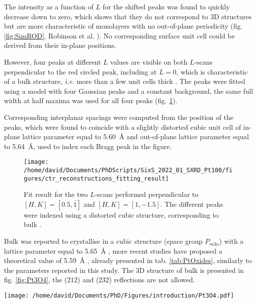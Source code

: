 The intensity as a function of $L$ for the shifted peaks was found to quickly decrease down to zero, which shows that they do not correspond to 3D structures but are more characteristic of monolayers with no out-of-plane periodicity (fig. \ref{fig:SimROD}, Robinson et al. \cite*{Robinson1991}).
No corresponding surface unit cell could be derived from their in-plane positions.

However, four peaks at different $L$ values are visible on both $L$-scans perpendicular to the red circled peak, including at $L=0$, which is characteristic of a bulk structure, \textit{i.e.} more than a few unit cells thick \parencite{Robinson1991}.
The peaks were fitted using a model with four Gaussian peaks and a constant background, the same full width at half maxima was used for all four peaks (fig. \ref{fig:FitPt100LScans}).

Corresponding interplanar spacings were computed from the position of the peaks, which were found to coincide with a slightly distorted cubic unit cell of in-plane lattice parameter equal to \qty{5.60}{\angstrom} and out-of-plane lattice parameter equal to \qty{5.64}{\angstrom}, used to index each Bragg peak in the figure.

\begin{figure}[!htb]
    \centering
    \texttt{[image: /home/david/Documents/PhDScripts/SixS\_2022\_01\_SXRD\_Pt100/figures/ctr\_reconstructions\_fitting\_result]}
    \caption{
        Fit result for the two $L$-scans performed perpendicular to $[H, K] = [0.5, \bar{1}]$ and $[H, K] = [1, -1.5]$.
        The different peaks were indexed using a distorted cubic structure, corresponding to bulk .
    }
    \label{fig:FitPt100LScans}
\end{figure}

Bulk  was reported to crystallise in a cubic structure (space group $P_{m3n}$) with a lattice parameter equal to \qty{5.65}{\angstrom} \parencite{Galloni1941, Galloni1952, Muller1968}, more recent studies have proposed a theoretical value of \qty{5.59}{\angstrom} \parencite{Seriani2006}, already presented in tab. \ref{tab:PtOxides}, similarly to the parameters reported in this study.
The 3D structure of bulk  is presented in fig. \ref{fig:Pt3O4}, the (212) and (232) reflections are not allowed.

\begin{SCfigure}
    \centering
    \texttt{[image: /home/david/Documents/PhD/Figures/introduction/Pt3O4.pdf]}
    \caption{
         bulk unit cell.
        Platinum atoms are situated on the faces on the cubic unit cell (e.g. $(0, 1/2, 1/4)$, $(0, 1/2, 3/4)$), while the eight oxygen atoms are inside the unit cell at the positions $(1/4, 1/4, z)$, $(1/4, 2/4, z)$, $(2/4, 1/4, z)$, $(2/4, 2/4, z)$ for $z=1/4$ and $z=3/4$.
    }
    \label{fig:Pt3O4}
\end{SCfigure}

